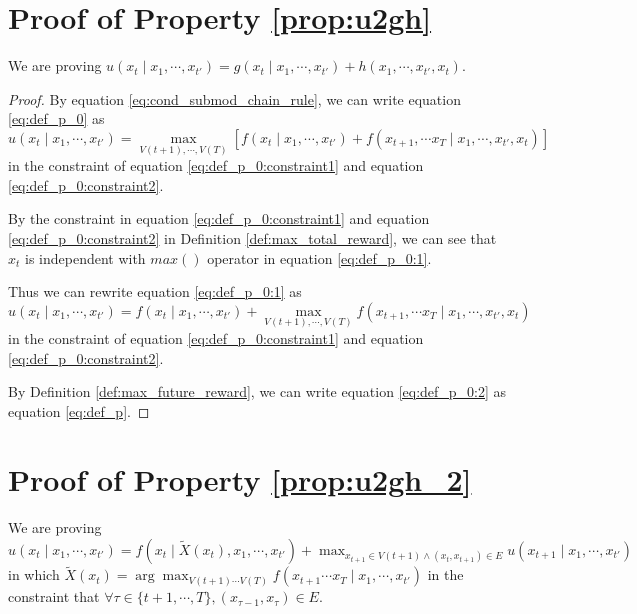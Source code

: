 \section{Proof of Property \ref{prop:u2gh}}
\label{app:proof_prop_u2gh}

We are proving
$ u(x_{t} \mid x_{1} , \cdots , x_{t'} ) = g(x_{t} \mid x_{1} , \cdots , x_{t'} ) + h( x_{1} , \cdots, x_{t'}, x_{t} ) $.

\begin{proof}

By equation \eqref{eq:cond_submod_chain_rule}, we can write equation \eqref{eq:def_p_0} as
\begin{equation}
\label{eq:def_p_0:1}
u(x_{t} \mid x_{1} , \cdots , x_{t'} ) = 
\max_{V(t+1), \cdots ,V(T) } [ f(x_{t} \mid x_{1}, \cdots , x_{t'}) + f( x_{t+1}, \cdots x_{T} \mid x_{1}, \cdots , x_{t'}, x_{t}) ]
\end{equation}
in the constraint of equation \eqref{eq:def_p_0:constraint1} and equation \eqref{eq:def_p_0:constraint2}.

By the constraint in equation \eqref{eq:def_p_0:constraint1} and equation \eqref{eq:def_p_0:constraint2}  in Definition \ref{def:max_total_reward},
we can see that $ x_{t} $ is independent with $ max() $ operator in equation \eqref{eq:def_p_0:1}.

Thus we can rewrite equation \eqref{eq:def_p_0:1} as
\begin{equation}
\label{eq:def_p_0:2}
u(x_{t} \mid x_{1} , \cdots , x_{t'} ) = f(x_{t} \mid x_{1}, \cdots , x_{t'})  + \max_{ V(t+1), \cdots , V(T) } f( x_{t+1}, \cdots x_{T} \mid x_{1}, \cdots , x_{t'}, x_{t})
\end{equation}
in the constraint of equation \eqref{eq:def_p_0:constraint1} and equation \eqref{eq:def_p_0:constraint2}.

By Definition \ref{def:max_future_reward}, we can write equation \eqref{eq:def_p_0:2} as equation \eqref{eq:def_p}.

\end{proof}

\section{Proof of Property \ref{prop:u2gh_2}}
\label{app:proof_prop_u2gh_2}

We are proving
$ u( x_{t} \mid x_{1} , \cdots , x_{t'} ) = f( x_{t} \mid \tilde{X}(x_{t}), x_{1} , \cdots , x_{t'} ) +  \max_{x_{t+1} \in V(t+1) \land ( x_{t}, x_{t+1} ) \in E} u( x_{t+1} \mid x_{1} , \cdots , x_{t'} ) $
in which
$ \tilde{X}(x_{t}) = \arg \max_{ V(t+1) \cdots V(T) } f( x_{t+1} \cdots x_{T} \mid x_{1} , \cdots , x_{t'} ) $
in the constraint that
$ \forall \tau \in \{ t+1 , \cdots , T \},  ( x_{ \tau-1 }, x_{ \tau } ) \in E $.

